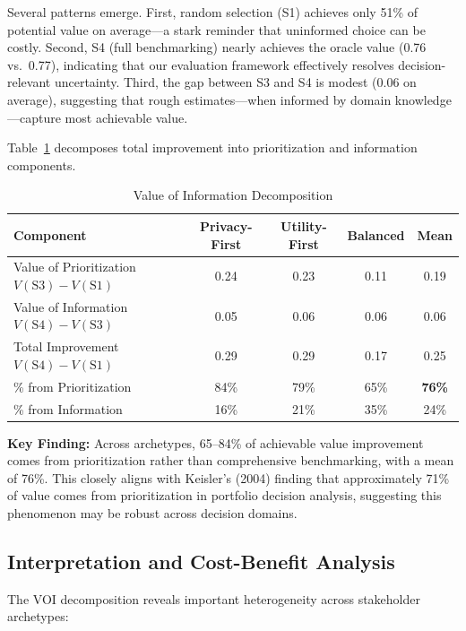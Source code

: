 \documentclass[12pt,a4paper]{article}
\begin{document}
Several patterns emerge. First, random selection (S1) achieves only 51\% of potential value on average---a stark reminder that uninformed choice can be costly. Second, S4 (full benchmarking) nearly achieves the oracle value (0.76 vs.\ 0.77), indicating that our evaluation framework effectively resolves decision-relevant uncertainty. Third, the gap between S3 and S4 is modest (0.06 on average), suggesting that rough estimates---when informed by domain knowledge---capture most achievable value.

Table~\ref{tab:voi} decomposes total improvement into prioritization and information components.

\begin{table}[htbp]
\centering
\caption{Value of Information Decomposition}
\label{tab:voi}
\begin{tabular}{@{}lcccc@{}}
\toprule
\textbf{Component} & \textbf{Privacy-First} & \textbf{Utility-First} & \textbf{Balanced} & \textbf{Mean} \\
\midrule
Value of Prioritization $V(\text{S3})-V(\text{S1})$ & 0.24 & 0.23 & 0.11 & 0.19 \\
Value of Information $V(\text{S4})-V(\text{S3})$ & 0.05 & 0.06 & 0.06 & 0.06 \\
Total Improvement $V(\text{S4})-V(\text{S1})$ & 0.29 & 0.29 & 0.17 & 0.25 \\
\midrule
\% from Prioritization & 84\% & 79\% & 65\% & \textbf{76\%} \\
\% from Information & 16\% & 21\% & 35\% & 24\% \\
\bottomrule
\end{tabular}
\end{table}

\textbf{Key Finding:} Across archetypes, 65--84\% of achievable value improvement comes from prioritization rather than comprehensive benchmarking, with a mean of 76\%. This closely aligns with Keisler's (2004) finding that approximately 71\% of value comes from prioritization in portfolio decision analysis, suggesting this phenomenon may be robust across decision domains.

\subsection{Interpretation and Cost-Benefit Analysis}

The VOI decomposition reveals important heterogeneity across stakeholder archetypes:
\end{document}
